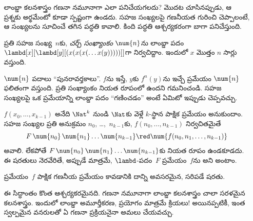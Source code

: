 \documentclass[../../../include/open-logic-section]{subfiles}
\begin{document}

లాంబ్డా కలనశాస్త్రం గణనా నమూనాగా ఎలా పనిచేయగలదు? మొదట చూసినప్పుడు,
ఆ ప్రశ్నకు అర్థమేంటో కూడా స్పష్టంగా ఉండదు. సహజ సంఖ్యలపై
గణనీయత గురించి చెప్పాలంటే, ఆ సంఖ్యలను సూచించే తగిన పద్ధతి కావాలి.
కింది పద్ధతి ఆశ్చర్యకరంగా బాగా పనిచేస్తుంది.

\begin{defn}
ప్రతి సహజ సంఖ్య~$n$కు, \emph{చర్చ్ సంఖ్యాంకం} $\num{n}$ను లాంబ్డా
పదం $\lambd[x][\lambd[y][(x(x(x(\dots
x(y)))))]]$గా నిర్వచిద్దాం. ఇందులో $x$ మొత్తం $n$ సార్లు వస్తుంది.
\end{defn}

$\num{n}$ పదాలు ``పునరావర్తకాలు''. $f$ను ఇస్తే,
$y$కు $f^n(y)$ను ఇచ్చే ప్రమేయం $\num{n}$ ఫలితంగా వస్తుంది. ప్రతి
సంఖ్యాంకం నియత రూపంలో ఉందని గమనించండి. సహజ సంఖ్యలపై ఒక ప్రమేయాన్ని
లాంబ్డా పదం ``గణించడం'' అంటే ఏమిటో ఇప్పుడు చెప్పవచ్చు.

\begin{defn}
$f(x_0, \dots, x_{k-1})$ అనేది $\Nat^k$ నుండి $\Nat$కు వెళ్లే
$k$-స్థాన పాక్షిక ప్రమేయం అనుకుందాం. సహజ సంఖ్యల ప్రతి అనుక్రమం
$n_0$, \dots,~$n_{k-1}$కు, $f(n_0, \dots, n_{k-1})$ నిర్వచితమైతే
\[
F\, \num{n_0}\, \num{n_1} \dots \num{n_{k-1}} \red \num{f(n_0, n_1, \dots,
  n_{k-1})}
\]
అవాలి. లేకపోతే $F\, \num{n_0}\, \num{n_1} \dots \num{n_{k-1}}$కు
నియత రూపం ఉండకూడదు. ఈ షరతులు నెరవేరితే, అప్పుడే మాత్రమే, $\lambd$-పదం~$F$ ప్రమేయం~$f$ను
 అని అంటాం.
\end{defn}

\begin{thm}
ప్రమేయం~$f$ పాక్షిక గణనీయ ప్రమేయం కావడానికి దాన్ని
 అవసరమైన, సరిపడే షరతు.
\end{thm}

\begin{explain}
ఈ సిద్ధాంతం కొంత ఆశ్చర్యకరమైనది. గణనా నమూనాగా లాంబ్డా కలనశాస్త్రం
చాలా సరళమైన కలనశాస్త్రం. ఇందులో లాంబ్డా అమూర్తీకరణ, ప్రయోగం మాత్రమే
క్రియలు!{} అయినప్పటికీ, ఇంత స్వల్పమైన వనరులతో ఏ గణనా ప్రక్రియనైనా
అమలు చేయవచ్చు.
\end{explain}
\end{document}
